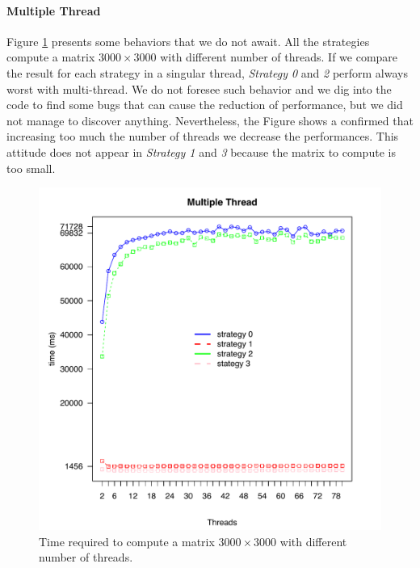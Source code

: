 \documentclass[]{article}
\begin{document}
\paragraph{Multiple Thread}
Figure \ref{fig:all_multiple} presents some behaviors that we do not await. All the strategies compute a matrix $3000\times 3000$ with different number of threads. If we compare the result for each strategy in a singular thread, \textit{Strategy 0} and \textit{2} perform always worst with multi-thread. We do not foresee such behavior and we dig into the code to find some bugs that can cause the reduction of performance, but we did not manage to discover anything. Nevertheless, the Figure shows a confirmed that increasing too much the number of threads we decrease the performances. This attitude does not appear in \textit{Strategy 1} and \textit{3} because the matrix to compute is too small.
\begin{figure}[H]
	\centering
	\includegraphics[width=1\textwidth]{img/all_multiple.pdf}
	\caption
	{Time required to compute a matrix $3000\times 3000$ with different number of threads.}
	\label{fig:all_multiple}
\end{figure}

\newpage
\end{document}
